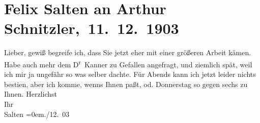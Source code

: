 

         
         \renewcommand{\erwaehntePersonen}{Personen: Heinrich Kanner, Felix Salten}
         \renewcommand{\erwaehnteOrte}{Orte: Wien}
         \renewcommand{\erwaehnteWerke}{}
               \section[ Felix Salten an Arthur Schnitzler, 11. 12. 1903]{ Felix Salten an Arthur Schnitzler, 11. 12. 1903}\nopagebreak{}\rehead{ }\begin{ledgroupsized}[t]{13cm}\normalsize\beginnumbering \toendnotes[C]{\smallbreak\pagebreak[2]} 
\toendnotes[C]{\smallbreak}\pstart
           \noindent{}{\pb}Lieber, gewiß begreife ich, dass Sie jetzt eher mit einer größeren
               Arbeit kämen. Habe auch mehr dem D\textsuperscript{r} Kanner zu Gefallen angefragt, und ziemlich spät, weil ich mir
               ja ungefähr so was selber dachte. Für Abends kann ich jetzt leider
               nichts besti{\geminationm}en, aber ich komme, wenns Ihnen paßt,
                  \label{K_L03356-1v}\label{K_L03356-1h} od. Donnerstag so gegen sechs zu Ihnen.\pend
           \pstart
           Herzlichst {\\[\baselineskip]}Ihr {\\[\baselineskip]}\spacefill\mbox{Salten}\pend
           \leftskip=0em{}./12. 03\pend
           
         
         \endnumbering{}\end{ledgroupsized}  \newcommand{\dateiname}{L03356}\newcommand{\titel}{Felix Salten an Arthur Schnitzler, 11. 12. 1903}\newcommand{\editorInnen}{Martin Anton Müller und Laura Untner}
      
